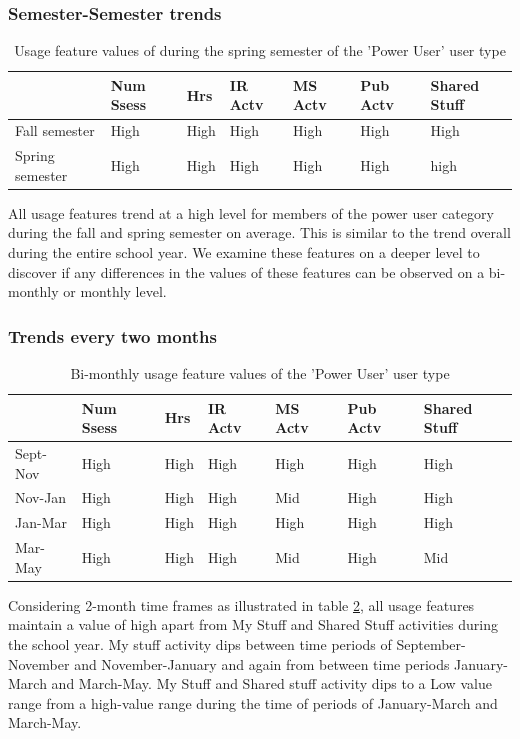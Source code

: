 \documentclass{acm_proc_article-sp}
\begin{document}
\subsubsection{Semester-Semester trends}

\begin{table}
\caption{Usage feature values of during the spring semester of the 'Power User' user type}
\label{cluster1month}
\begin{tabular}{|p{1.5cm}|p{0.6cm}|p{0.6cm}|p{0.6cm}|p{0.6cm}|p{0.8cm}|p{0.8cm}|}
 & Num Ssess & Hrs & IR Actv & MS Actv & Pub Actv & Shared Stuff \\ \hline
Fall  semester & High & High  & High & High & High & High \\ \hline
Spring semester & High & High  & High & High & High & high \\ \hline
\end{tabular}
\end{table}

All usage features trend at a high level for members of the power user category during the fall and spring semester on average. This is similar to the trend overall during the entire school year. We examine these features on a deeper level to discover if any differences in the values of these features can be observed on a bi-monthly or monthly level.

\subsubsection{Trends every two months}
\begin{table}
\caption{Bi-monthly usage feature values of the 'Power User' user type}
\label{cluster1bimonthly}
\begin{tabular}{|p{1.5cm}|p{0.6cm}|p{0.6cm}|p{0.6cm}|p{0.6cm}|p{0.8cm}|p{0.8cm}|}
 & Num Ssess & Hrs & IR Actv & MS Actv & Pub Actv & Shared Stuff \\ \hline
Sept-Nov & High & High  & High & High & High & High \\ \hline
Nov-Jan & High & High  & High & Mid & High & High \\ \hline
Jan-Mar & High & High  & High & High & High & High \\ \hline
Mar-May & High & High  & High & Mid & High & Mid \\ \hline
\end{tabular}
\end{table}

Considering 2-month time frames as illustrated in table \ref{cluster1bimonthly}, all usage features maintain a value of high apart from My Stuff and Shared Stuff activities during the school year. My stuff activity dips between time periods of September-November and November-January and again from between time periods January-March and March-May.
My Stuff and Shared stuff activity dips to a Low value range from a high-value range during the time of periods of January-March and March-May.
\end{document}
